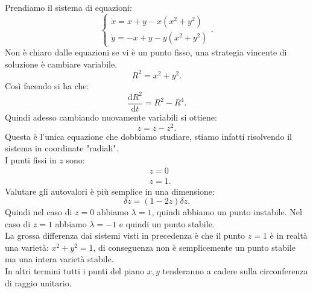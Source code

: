 \noindent
\begin{exmp}
    Prendiamo il sistema di equazioni:
    \[
        \begin{cases}
	    \dot{x} = x + y - x (x^2+y^2) \\
	    \dot{y}=- x + y - y(x^2+ y^2) 
        \end{cases}
    .\] 
    Non è chiaro dalle equazioni se vi è un punto fisso, una strategia vincente di soluzione è cambiare variabile.
    \[
        R^2=x^2+y^2
    .\] 
    Così facendo si ha che:
    \[
        \frac{\text{d} R^2}{\text{d} t} = R^2-R^4
    .\] 
    Quindi adesso cambiando nuovamente variabili si ottiene:
    \[
        \dot{z}=z-z^2
    .\] 
    Questa è l'unica equazione che dobbiamo studiare, stiamo infatti risolvendo il sistema in coordinate "radiali".\\
    I punti fissi in $z$ sono:
    \[\begin{aligned}
	& z = 0\\
	& z = 1
    .\end{aligned}\] 
    Valutare gli autovalori è più semplice in una dimensione:
    \[
	\delta\dot{z}=(1-2z) \delta z
    .\] 
    Quindi nel caso di $z=0$ abbiamo $\lambda =1$, quindi abbiamo un punto instabile. Nel caso di $z=1$ abbiamo $\lambda =-1$ e quindi un punto stabile.\\
    La grossa differenza dai sistemi visti in precedenza è che il punto $z=1$ è in realtà una varietà: $x^2+y^2=1$, di conseguenza non è semplicemente un punto stabile ma una intera varietà stabile.\\
    In altri termini tutti i punti del piano $x,y$ tenderanno a cadere sulla circonferenza di raggio unitario. 
\end{exmp}
\noindent
\clearpage
